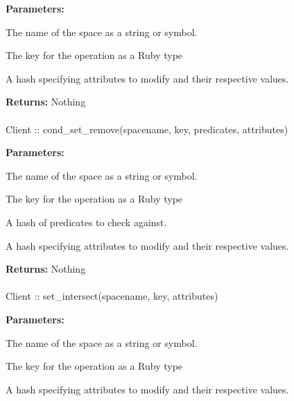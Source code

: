 \noindent\textbf{Parameters:}
\begin{description}[labelindent=\widthof{{attributes}},leftmargin=*,noitemsep,nolistsep,align=right]
\item[spacename] The name of the space as a string or symbol.
\item[key] The key for the operation as a Ruby type
\item[attributes] A hash specifying attributes to modify and their respective values.
\end{description}

\noindent\textbf{Returns:}
Nothing

\paragraph{}
\begin{ccode}
Client :: cond_set_remove(spacename, key, predicates, attributes)
\end{ccode}
\funcdesc 

\noindent\textbf{Parameters:}
\begin{description}[labelindent=\widthof{{predicates}},leftmargin=*,noitemsep,nolistsep,align=right]
\item[spacename] The name of the space as a string or symbol.
\item[key] The key for the operation as a Ruby type
\item[predicates] A hash of predicates to check against.
\item[attributes] A hash specifying attributes to modify and their respective values.
\end{description}

\noindent\textbf{Returns:}
Nothing

\paragraph{}
\begin{ccode}
Client :: set_intersect(spacename, key, attributes)
\end{ccode}
\funcdesc 

\noindent\textbf{Parameters:}
\begin{description}[labelindent=\widthof{{attributes}},leftmargin=*,noitemsep,nolistsep,align=right]
\item[spacename] The name of the space as a string or symbol.
\item[key] The key for the operation as a Ruby type
\item[attributes] A hash specifying attributes to modify and their respective values.
\end{description}

